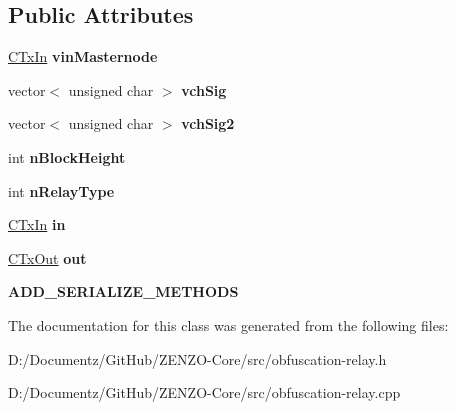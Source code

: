 \subsection*{Public Attributes}
\begin{DoxyCompactItemize}
\item 
\mbox{\label{class_c_obfu_scation_relay_a2ed0c6540e4ca29ca8a3da93a7afcd6c}} 
\mbox{\hyperlink{class_c_tx_in}{C\+Tx\+In}} {\bfseries vin\+Masternode}
\item 
\mbox{\label{class_c_obfu_scation_relay_a447bd41831d194cb75bc510c6e017d09}} 
vector$<$ unsigned char $>$ {\bfseries vch\+Sig}
\item 
\mbox{\label{class_c_obfu_scation_relay_a9219391dcbec4c9ee0908cda8231db87}} 
vector$<$ unsigned char $>$ {\bfseries vch\+Sig2}
\item 
\mbox{\label{class_c_obfu_scation_relay_a2fff72497df00c2cdfb831d509e6eee8}} 
int {\bfseries n\+Block\+Height}
\item 
\mbox{\label{class_c_obfu_scation_relay_a5649103671b2584c53b66ae889103c0a}} 
int {\bfseries n\+Relay\+Type}
\item 
\mbox{\label{class_c_obfu_scation_relay_a360c5bb13099d76d38218ae146e6bcff}} 
\mbox{\hyperlink{class_c_tx_in}{C\+Tx\+In}} {\bfseries in}
\item 
\mbox{\label{class_c_obfu_scation_relay_a9dce88a9df20b198f0feb9c95953dcc9}} 
\mbox{\hyperlink{class_c_tx_out}{C\+Tx\+Out}} {\bfseries out}
\item 
\mbox{\label{class_c_obfu_scation_relay_ae493c4af77e1350956ffabce327c54ad}} 
{\bfseries A\+D\+D\+\_\+\+S\+E\+R\+I\+A\+L\+I\+Z\+E\+\_\+\+M\+E\+T\+H\+O\+DS}
\end{DoxyCompactItemize}


The documentation for this class was generated from the following files\+:\begin{DoxyCompactItemize}
\item 
D\+:/\+Documentz/\+Git\+Hub/\+Z\+E\+N\+Z\+O-\/\+Core/src/obfuscation-\/relay.\+h\item 
D\+:/\+Documentz/\+Git\+Hub/\+Z\+E\+N\+Z\+O-\/\+Core/src/obfuscation-\/relay.\+cpp\end{DoxyCompactItemize}
